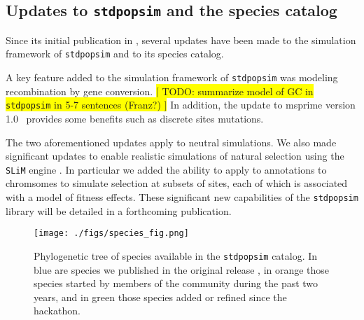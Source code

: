 \documentclass[hidelinks]{article}
\newcommand{\stdpopsim}{\texttt{stdpopsim}\xspace}
\begin{document}
\hypertarget{sec3}{%
	\subsection*{Updates to \stdpopsim and the species catalog}\label{sec:expanded-catalog}}

Since its initial publication in \cite{Adrion2020}, several updates have been made
to  the simulation framework of \stdpopsim and to its species catalog.

A key feature added to the simulation framework of \stdpopsim
was modeling recombination by gene conversion. %
\colorbox{yellow}{[ TODO: summarize model of GC in \stdpopsim in 5-7 sentences (Franz?) ]}
In addition, the update to msprime version 1.0~\citep{Baumdicker2022}
provides some benefits such as discrete sites mutations.


The two aforementioned updates apply to neutral simulations.
We also made significant updates to enable realistic simulations of natural selection
using the \texttt{SLiM} engine \citep{Haller2019}. In particular we added the ability to
apply to annotations to chromsomes to simulate selection at subsets of sites,
each of which is associated with a model of fitness effects.
These significant new capabilities of the \stdpopsim library will be detailed in a forthcoming publication.

\begin{figure}
	\texttt{[image: ./figs/species\_fig.png]}
	\caption{Phylogenetic tree of species available in the \stdpopsim catalog.
		In blue are species we published in the original release \citep{Adrion2020}, in orange those 
		species started by members of the community during the past two years, and in green those species
		added or refined since the hackathon.
		\color{red}{Names are cutoff on right hand side of figure}}
	\label{fig:tree}
\end{figure}
\end{document}

